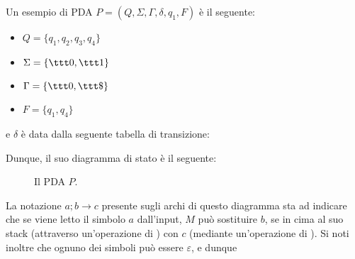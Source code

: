 \documentclass[a4paper, 12pt]{report}
\begin{document}
    \begin{example}[PDA]
        \label{pda ex}
        Un esempio di PDA $P = (Q, \Sigma, \Gamma, \delta, q_1, F)$ è il seguente:

        \begin{itemize}
            \item $Q = \{q_1, q_2, q_3, q_4\}$
            \item $\Sigma = \{ \ttt 0, \ttt 1 \}$
            \item $\Gamma = \{ \ttt 0, \ttt \$\}$
            \item $F = \{ q_1, q_4 \}$
        \end{itemize}

        e $\delta$ è data dalla seguente tabella di transizione:


        Dunque, il suo diagramma di stato è il seguente:

        \begin{figure}[H]
            \centering
             \caption{Il PDA $P$.}
        \end{figure}

        La notazione $a; b \to c$ presente sugli archi di questo diagramma sta ad indicare che se viene letto il simbolo $a$ dall'input, $M$ può sostituire $b$, se in cima al suo stack (attraverso un'operazione di ) con $c$ (mediante un'operazione di ). Si noti inoltre che ognuno dei simboli può essere $\varepsilon$, e dunque


\end{example}
\end{document}
